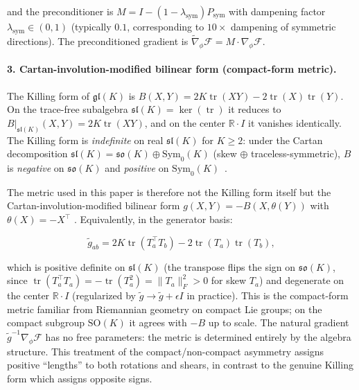 \documentclass[twoside,11pt]{article}
\begin{document}
and the preconditioner is $M = I - (1 - \lambda_{\mathrm{sym}}) P_{\mathrm{sym}}$ with dampening factor $\lambda_{\mathrm{sym}} \in (0, 1)$ (typically $0.1$, corresponding to $10\times$ dampening of symmetric directions). The preconditioned gradient is $\tilde{\nabla}_\phi \mathcal{F} = M \cdot \nabla_\phi \mathcal{F}$.

\paragraph{3. Cartan-involution-modified bilinear form (compact-form metric).}
The Killing form of $\mathfrak{gl}(K)$ is $B(X, Y) = 2K \operatorname{tr}(XY) - 2\operatorname{tr}(X)\operatorname{tr}(Y)$. On the trace-free subalgebra $\mathfrak{sl}(K) = \ker(\operatorname{tr})$ it reduces to $B|_{\mathfrak{sl}(K)}(X,Y) = 2K\operatorname{tr}(XY)$, and on the center $\mathbb{R}\cdot I$ it vanishes identically. The Killing form is \emph{indefinite} on real $\mathfrak{sl}(K)$ for $K\geq 2$: under the Cartan decomposition $\mathfrak{sl}(K) = \mathfrak{so}(K) \oplus \mathrm{Sym}_0(K)$ (skew $\oplus$ traceless-symmetric), $B$ is \emph{negative} on $\mathfrak{so}(K)$ and \emph{positive} on $\mathrm{Sym}_0(K)$~\citep{Hall2015,Gallier2020}.

The metric used in this paper is therefore not the Killing form itself but the Cartan-involution-modified bilinear form $g(X, Y) = -B(X, \theta(Y))$ with $\theta(X) = -X^\top$ \citep[Prop.~1.93]{Knapp2002}. Equivalently, in the generator basis:

\begin{equation}
\tilde{g}_{ab} = 2K \operatorname{tr}(T_a^\top T_b) - 2\operatorname{tr}(T_a)\operatorname{tr}(T_b),
\label{eq:killing_metric}
\end{equation}

which is positive definite on $\mathfrak{sl}(K)$ (the transpose flips the sign on $\mathfrak{so}(K)$, since $\operatorname{tr}(T_a^\top T_a) = -\operatorname{tr}(T_a^2) = \|T_a\|_F^2 > 0$ for skew $T_a$) and degenerate on the center $\mathbb{R} \cdot I$ (regularized by $\tilde{g} \to \tilde{g} + \epsilon I$ in practice). This is the compact-form metric familiar from Riemannian geometry on compact Lie groups; on the compact subgroup $\mathrm{SO}(K)$ it agrees with $-B$ up to scale. The natural gradient $\tilde{g}^{-1} \nabla_\phi \mathcal{F}$ has no free parameters: the metric is determined entirely by the algebra structure. This treatment of the compact/non-compact asymmetry assigns positive ``lengths'' to both rotations and shears, in contrast to the genuine Killing form which assigns opposite signs.
\end{document}
